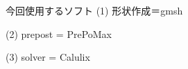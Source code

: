 \begin{frame}{今回使用するソフト}
	(1) 形状作成＝gmsh

	(2) prepost = PrePoMax

	(3) solver = Calulix
\end{frame}
